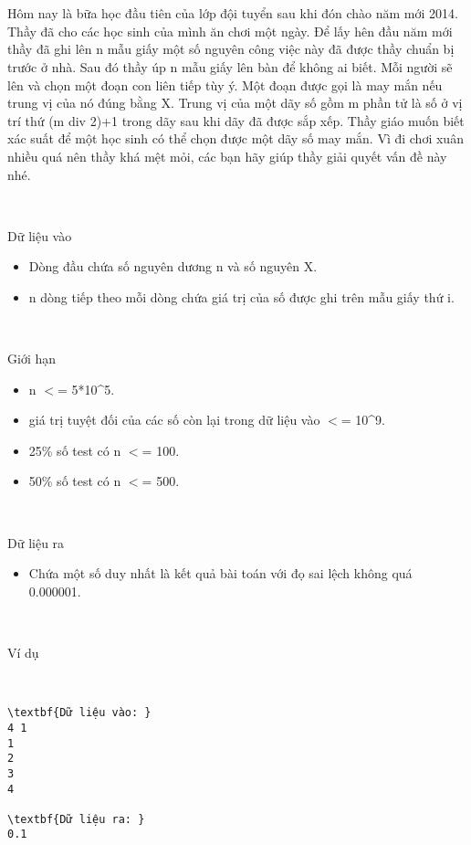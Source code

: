 

 

 

Hôm nay là bữa học đầu tiên của lớp đội tuyển sau khi đón chào năm mới 2014. Thầy đã cho các học sinh của mình ăn chơi một ngày. Để lấy hên đầu năm mới thầy đã ghi lên n mẫu giấy một số nguyên công việc này đã được thầy chuẩn bị trước ở nhà. Sau đó thầy úp n mẫu giấy lên bàn để không ai biết. Mỗi người sẽ lên và chọn một đoạn con liên tiếp tùy ý. Một đoạn được gọi là may mắn nếu trung vị của nó đúng bằng X. Trung vị của một dãy số gồm m phần tử là số ở vị trí thứ (m div 2)+1 trong dãy sau khi dãy đã được sắp xếp. Thầy giáo muốn biết xác suất để một học sinh có thể chọn được một dãy số may mắn. Vì đi chơi xuân nhiều quá nên thầy khá mệt mỏi, các bạn hãy giúp thầy giải quyết vấn đề này nhé.

 

Dữ liệu vào
\begin{itemize}
	\item Dòng đầu chứa số nguyên dương n và số nguyên X.
	\item n dòng tiếp theo mỗi dòng chứa giá trị của số được ghi trên mẫu giấy thứ i.
\end{itemize}

 

Giới hạn
\begin{itemize}
	\item n $<$= 5*10\textasciicircum5.
	\item giá trị tuyệt đối của các số còn lại trong dữ liệu vào $<$= 10\textasciicircum9.
	\item 25\% số test có n $<$= 100.
	\item 50\% số test có n $<$= 500.
\end{itemize}

 

Dữ liệu ra
\begin{itemize}
	\item Chứa một số duy nhất là kết quả bài toán với đọ sai lệch không quá 0.000001.
\end{itemize}

 

Ví dụ

 
\begin{verbatim}
\textbf{Dữ liệu vào: }
4 1
1
2
3
4

\textbf{Dữ liệu ra: }
0.1\end{verbatim}

 


\\ 

 